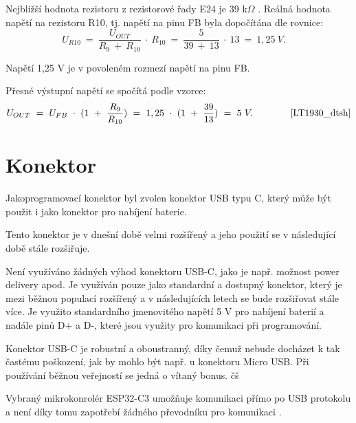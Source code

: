 Nejbližší hodnota rezistoru z rezistorové řady E24 je 39 k$\Omega$ \cite{rezistorova_rada}. Reálná hodnota napětí na rezistoru R10, tj. napětí na pinu FB byla dopočítána
dle rovnice:
\begin{equation} 
  U_{R10}~=~\frac{U_{OUT}}{R_{9}~+~R_{10}}~\cdot~R_{10}~=~\frac{5}{39~+~13}~\cdot~13~=~1,25~V. 
  \quad
\label{eq:UR10}
\end{equation}

Napětí 1,25 V je v povoleném rozmezí napětí na pinu FB. 

Přesné výstupní napětí se spočítá podle vzorce:
\begin{equation} 
  U_{OUT}~=~U_{FB}~\cdot~(1~+~\frac{R_{9}}{R_{10}})~=~1,25~\cdot~(1~+~\frac{39}{13})~=~5~V. 
  \quad \quad \quad \quad \cite{LT1930_dtsh}
\label{eq:VOUT_LT1930}
\end{equation}



\section{Konektor}
Jakoprogramovací konektor byl zvolen konektor USB typu C, který může být použit i jako konektor pro nabíjení baterie.

Tento konektor je v dnešní době velmi rozšířený a jeho použití se v následující době stále rozšiřuje. 

Není využíváno žádných výhod konektoru USB-C, jako je např. možnost power delivery apod. Je využíván pouze jako standardní a dostupný konektor, který je mezi běžnou
populací rozšířený a v následujících letech se bude rozšiřovat stále více. Je využito standardního jmenovitého napětí 5 V pro nabíjení baterií a nadále pinů D+ a D-, 
které jsou využity pro komunikaci při programování. 

Konektor USB-C je robustní a oboustranný, díky čemuž nebude docházet k tak častému poškození, jak by mohlo být např. u konektoru Micro USB. Při používání běžnou veřejností
se jedná o vítaný bonus. čš

Vybraný mikrokonrolér ESP32-C3 umožňuje komunikaci přímo po USB protokolu a není díky tomu zapotřebí žádného převodníku pro komunikaci \cite{ESP_C3_dtsh}. %





